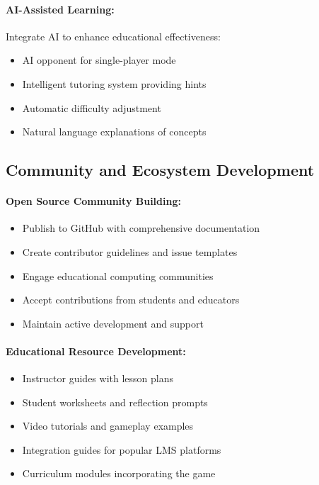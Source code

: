 \paragraph*{AI-Assisted Learning:}

Integrate AI to enhance educational effectiveness:

\begin{itemize}
    \item AI opponent for single-player mode
    \item Intelligent tutoring system providing hints
    \item Automatic difficulty adjustment
    \item Natural language explanations of concepts
\end{itemize}

\subsection{Community and Ecosystem Development}
\label{subsec:community-development}

\paragraph*{Open Source Community Building:}

\begin{itemize}
    \item Publish to GitHub with comprehensive documentation
    \item Create contributor guidelines and issue templates
    \item Engage educational computing communities
    \item Accept contributions from students and educators
    \item Maintain active development and support
\end{itemize}

\paragraph*{Educational Resource Development:}

\begin{itemize}
    \item Instructor guides with lesson plans
    \item Student worksheets and reflection prompts
    \item Video tutorials and gameplay examples
    \item Integration guides for popular LMS platforms
    \item Curriculum modules incorporating the game
\end{itemize}

